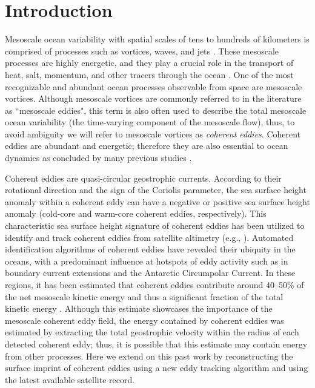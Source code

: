 \documentclass[draft,linenumbers]{agujournal2019}
\begin{document}
\section{Introduction}

Mesoscale ocean variability with spatial scales of tens to hundreds of kilometers is comprised of processes such as vortices, waves, and jets \citep{Ferrari_energy_2009, Fu_Eddy_2010}. 
These mesoscale processes are highly energetic, and they play a crucial role in the transport of heat, salt, momentum, and other tracers through the ocean \citep{Wunsch_energetics_2004, Wyrtki_Eddy_1976, Gill_Energy_1974}. One of the most recognizable and abundant ocean processes observable from space are mesoscale vortices. Although mesoscale vortices are commonly referred to in the literature as ``mesoscale eddies", this term is also often used to describe the total mesoscale ocean variability (the time-varying component of the mesoscale flow), thus, to avoid ambiguity we will refer to mesoscale vortices as \emph{coherent eddies}. Coherent eddies are abundant and energetic; therefore they are also essential to ocean dynamics as concluded by many previous studies \citep{Hogg_Interdecadal_2006,Siegel_Bio_2011,BeronVera_Agulhas_2013,Frenger_Imprint_2013,Frenger_Southern_2015,Pilo_eddy_2015,Schubert_submesoscale_2019,Patel_SO_eddies_2020}.



Coherent eddies are quasi-circular geostrophic currents. According to their rotational direction and the sign of the Coriolis parameter, the sea surface height anomaly within a coherent eddy can have a negative or positive sea surface height anomaly (cold-core and warm-core coherent eddies, respectively). 
This characteristic sea surface height signature of coherent eddies has been utilized to identify and track coherent eddies from satellite altimetry (e.g., \citealp{Chelton_Global_2007, Faghmous_A_2015, Ashkezari_eddies_2016,Martinez_TKE_2019, Cui_eddy_identification_2020}). 
Automated identification algorithms of coherent eddies have revealed their ubiquity in the oceans, with a predominant influence at hotspots of eddy activity such as in boundary current extensions and the Antarctic Circumpolar Current. In these regions, it has been estimated that coherent eddies contribute around 40--50\% of the net mesoscale kinetic energy \citep{Chelton_The_2011} and thus a significant fraction of the total kinetic energy \citep{Ferrari_energy_2009}. 
Although this estimate showcases the importance of the mesoscale coherent eddy field, the energy contained by coherent eddies was estimated by extracting the total geostrophic velocity within the radius of each detected coherent eddy; thus, it is possible that this estimate may contain energy from other processes. 
Here we extend on this past work by reconstructing the surface imprint of coherent eddies using a new eddy tracking algorithm and using the latest  available satellite record.
\end{document}
